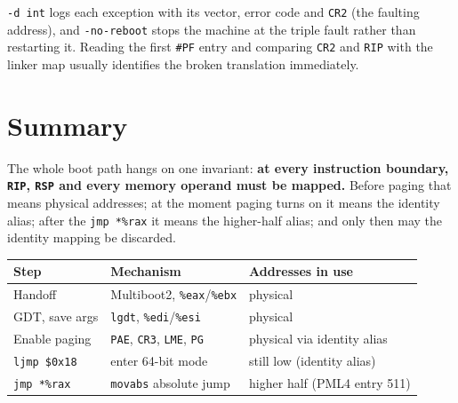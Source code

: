 \texttt{-d\ int} logs each exception with its vector, error code and \texttt{CR2} (the faulting address), and \texttt{-no-reboot} stops the machine at the triple fault rather than restarting it. Reading the first \texttt{\#PF} entry and comparing \texttt{CR2} and \texttt{RIP} with the linker map usually identifies the broken translation immediately.

\section{Summary}

The whole boot path hangs on one invariant: \textbf{at every instruction boundary, \texttt{RIP}, \texttt{RSP} and every memory operand must be mapped.} Before paging that means physical addresses; at the moment paging turns on it means the identity alias; after the \texttt{jmp\ *\%rax} it means the higher-half alias; and only then may the identity mapping be discarded.

\begin{longtable}[]{@{}
  >{\raggedright\arraybackslash}p{}
  >{\raggedright\arraybackslash}p{}
  >{\raggedright\arraybackslash}p{}@{}}
\toprule\noalign{}
\begin{minipage}[b]{\linewidth}\raggedright
Step
\end{minipage} & \begin{minipage}[b]{\linewidth}\raggedright
Mechanism
\end{minipage} & \begin{minipage}[b]{\linewidth}\raggedright
Addresses in use
\end{minipage} \\
\midrule\noalign{}
\endhead
\bottomrule\noalign{}
\endlastfoot
Handoff & Multiboot2, \texttt{\%eax}/\texttt{\%ebx} & physical \\
GDT, save args & \texttt{lgdt}, \texttt{\%edi}/\texttt{\%esi} & physical \\
Enable paging & \texttt{PAE}, \texttt{CR3}, \texttt{LME}, \texttt{PG} & physical via identity alias \\
\texttt{ljmp\ \$0x18} & enter 64-bit mode & still low (identity alias) \\
\texttt{jmp\ *\%rax} & \texttt{movabs} absolute jump & higher half (PML4 entry 511) \\
\end{longtable}
